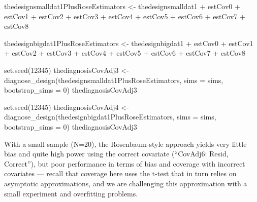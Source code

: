 \documentclass[
  12pt,
]{book}
\newenvironment{Shaded}{\begin{snugshade}}{\end{snugshade}}
\newcommand{\AttributeTok}[1]{\textcolor[rgb]{0.77,0.63,0.00}{#1}}
\newcommand{\DecValTok}[1]{\textcolor[rgb]{0.00,0.00,0.81}{#1}}
\newcommand{\FunctionTok}[1]{\textcolor[rgb]{0.00,0.00,0.00}{#1}}
\newcommand{\NormalTok}[1]{#1}
\newcommand{\OtherTok}[1]{\textcolor[rgb]{0.56,0.35,0.01}{#1}}
\newcommand{\SpecialCharTok}[1]{\textcolor[rgb]{0.00,0.00,0.00}{#1}}
\theoremstyle{definition}
\theoremstyle{definition}
\theoremstyle{definition}
\theoremstyle{remark}
\begin{document}
\begin{Shaded}
\begin{Highlighting}[]
\NormalTok{thedesignsmalldat1PlusRoseEstimators }\OtherTok{\textless{}{-}}\NormalTok{ thedesignsmalldat1 }\SpecialCharTok{+}\NormalTok{ estCov0 }\SpecialCharTok{+}\NormalTok{ estCov1 }\SpecialCharTok{+}\NormalTok{ estCov2 }\SpecialCharTok{+}
\NormalTok{  estCov3 }\SpecialCharTok{+}\NormalTok{ estCov4 }\SpecialCharTok{+}\NormalTok{ estCov5 }\SpecialCharTok{+}\NormalTok{ estCov6 }\SpecialCharTok{+}\NormalTok{ estCov7 }\SpecialCharTok{+}\NormalTok{ estCov8}

\NormalTok{thedesignbigdat1PlusRoseEstimators }\OtherTok{\textless{}{-}}\NormalTok{ thedesignbigdat1 }\SpecialCharTok{+}\NormalTok{ estCov0 }\SpecialCharTok{+}\NormalTok{ estCov1 }\SpecialCharTok{+}\NormalTok{ estCov2 }\SpecialCharTok{+}
\NormalTok{  estCov3 }\SpecialCharTok{+}\NormalTok{ estCov4 }\SpecialCharTok{+}\NormalTok{ estCov5 }\SpecialCharTok{+}\NormalTok{ estCov6 }\SpecialCharTok{+}\NormalTok{ estCov7 }\SpecialCharTok{+}\NormalTok{ estCov8}
\end{Highlighting}
\end{Shaded}

\begin{Shaded}
\begin{Highlighting}[]
\FunctionTok{set.seed}\NormalTok{(}\DecValTok{12345}\NormalTok{)}
\NormalTok{thediagnosisCovAdj3 }\OtherTok{\textless{}{-}} \FunctionTok{diagnose\_design}\NormalTok{(thedesignsmalldat1PlusRoseEstimators, }\AttributeTok{sims =}\NormalTok{ sims, }\AttributeTok{bootstrap\_sims =} \DecValTok{0}\NormalTok{)}
\NormalTok{thediagnosisCovAdj3}
\end{Highlighting}
\end{Shaded}

\begin{Shaded}
\begin{Highlighting}[]
\FunctionTok{set.seed}\NormalTok{(}\DecValTok{12345}\NormalTok{)}
\NormalTok{thediagnosisCovAdj4 }\OtherTok{\textless{}{-}} \FunctionTok{diagnose\_design}\NormalTok{(thedesignbigdat1PlusRoseEstimators, }\AttributeTok{sims =}\NormalTok{ sims, }\AttributeTok{bootstrap\_sims =} \DecValTok{0}\NormalTok{)}
\NormalTok{thediagnosisCovAdj3}
\end{Highlighting}
\end{Shaded}

With a small sample (N=20), the Rosenbaum-style approach yields very
little bias and quite high power using the correct covariate (``CovAdj6:
Resid, Correct''), but poor performance in terms of bias and coverage
with incorrect covariates --- recall that coverage here uses the t-test
that in turn relies on asymptotic approximations, and we are challenging
this approximation with a small experiment and overfitting problems.
\end{document}
